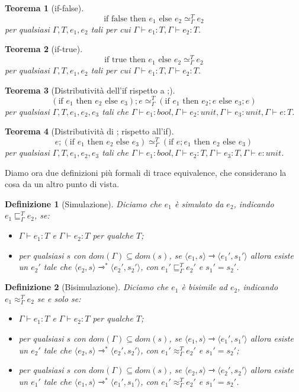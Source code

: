 \documentclass[a4paper, 11pt]{article}
\newtheorem{thm}{Teorema}[section]
\newtheorem{definit}{Definizione}[section]
\newcommand{\type}{\Gamma \vdash}
\newcommand{\goesto}{\rightarrowtriangle}
\newcommand{\treq}{\simeq_\Gamma^T}
\begin{document}
\begin{thm}[if-false]
	\[ \text{if false then }e_1 \text{ else } e_2 \treq e_2 \]
	per qualsiasi $\Gamma, T, e_1, e_2$ tali per cui $\type e_1:T, \type e_2:T$.
\end{thm}

\begin{thm}[if-true]
	\[ \text{if true then }e_1 \text{ else } e_2 \treq e_2 \]
	per qualsiasi $\Gamma, T, e_1, e_2$ tali per cui $\type e_1:T, \type e_2:T$.
\end{thm}

\begin{thm}[Distributività dell'if rispetto a ;]
	\[ (\text{if } e_1 \text{ then }e_2 \text{ else } e_3);e \treq (\text{if }e_1 \text{ then }e_2; e \text{ else }e_3; e) \]
	per qualsiasi $\Gamma, T, e_1, e_2, e_3$ tali che $\type e_1:bool, \type e_2:unit, \type e_3:unit, \type e:T$.
\end{thm}

\begin{thm}[Distributività di ; rispetto all'if]
	\[ e;(\text{if } e_1 \text{ then }e_2 \text{ else }e_3) \treq (\text{if } e;e_1 \text{ then }e_2 \text{ else }e_3) \]
	per qualsiasi $\Gamma, T, e_1, e_2, e_3$ tali che $\type e_1:bool, \type e_2:T, \type e_3:T, \type e:unit$.
\end{thm}

Diamo ora due definizioni più formali di trace equivalence, che considerano la cosa da un altro punto di vista.
\begin{definit}[Simulazione]
	Diciamo che $e_1$ è simulato da $e_2$, indicando $e_1 \sqsubseteq_\Gamma^T e_2$, se:\begin{itemize}
		\item $\type e_1:T$ e $\type e_2:T$ per qualche $T$;
		\item per qualsiasi $s$ con $dom(\Gamma) \subseteq dom(s)$, se $\langle e_1, s\rangle \goesto \langle e_1',s_1' \rangle$ allora esiste un $e_2'$ tale che $\langle e_2, s \rangle \goesto^\ast \langle e_2',s_2' \rangle$, con $e_1' \sqsubseteq_\Gamma^T e_2'$ e $s_1'=s_2'$.
	\end{itemize}
\end{definit}

\begin{definit}[Bisimulazione]
	Diciamo che $e_1$ è bisimile ad $e_2$, indicando $e_1 \approx_\Gamma^T e_2$ se e solo se:\begin{itemize}
		\item $\type e_1:T$ e $\type e_2:T$ per qualche $T$;
		\item per qualsiasi $s$ con $dom(\Gamma) \subseteq dom(s)$, se $\langle e_1, s\rangle \goesto \langle e_1',s_1' \rangle$ allora esiste un $e_2'$ tale che $\langle e_2, s \rangle \goesto^\ast \langle e_2',s_2' \rangle$, con $e_1' \approx_\Gamma^T e_2'$ e $s_1'=s_2'$;
		\item per qualsiasi $s$ con $dom(\Gamma) \subseteq dom(s)$, se $\langle e_2, s\rangle \goesto \langle e_2',s_2' \rangle$ allora esiste un $e_1'$ tale che $\langle e_1, s \rangle \goesto^\ast \langle e_1',s_1' \rangle$, con $e_1' \approx_\Gamma^T e_2'$ e $s_1'=s_2'$.
	\end{itemize}
\end{definit}
\end{document}
